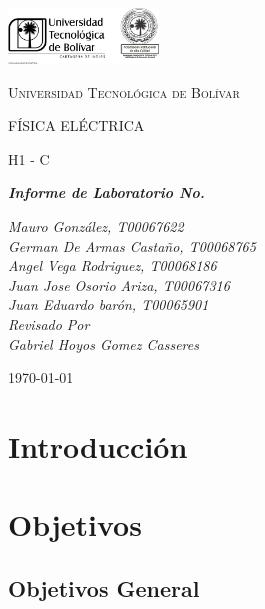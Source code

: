 \documentclass[letterpaper, 12pt]{report}
\begin{document}
\begin{titlepage}
	\centering
	\includegraphics[width=0.3\textwidth]{Images/logo_utb.png}\par\vspace{1cm}
	{\scshape\LARGE Universidad Tecnológica de Bolívar \par}
	\vspace{1cm}

	{\scshape\Large FÍSICA ELÉCTRICA \par}
	\vspace{.2cm}

	{\scshape\Large H1 - C \par}
	\vspace{1cm}
	\slshape {\Large \bfseries{}Informe de Laboratorio No.  \\}
	\vspace{1cm}

	\slshape {\itshape{} Mauro González, T00067622 \\}
	\slshape {\itshape{} German De Armas Castaño, T00068765 \\}
	\slshape {\itshape{} Angel Vega Rodriguez, T00068186 \\}
	\slshape {\itshape{} Juan Jose Osorio Ariza, T00067316 \\}
	\slshape {\itshape{} Juan Eduardo barón, T00065901 \\}
	\vfill
	Revisado Por \\
	Gabriel Hoyos Gomez Casseres\\
	{\large \today\par}
\end{titlepage}

\section{Introducción}

\newpage

\section{Objetivos}

\subsection{Objetivos General}
\end{document}
